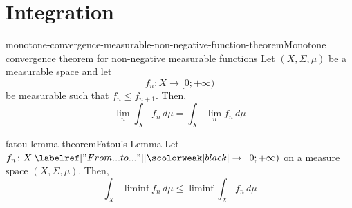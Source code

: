 \documentclass[preview]{standalone}
\begin{document}
\genpage

\section{Integration}

\begin{snippettheorem}{monotone-convergence-measurable-non-negative-function-theorem}{Monotone convergence theorem for non-negative measurable functions}
    Let \((X, \Sigma, \mu)\) be a measurable space and let
    \[
        f_n \colon X \to [0; +\infty)
    \] be measurable
    such that \(f_n \leq f_{n+1}\). Then,
    \[
        \lim_n \int_X f_n\,d\mu = \int_X \lim_n f_n\,d\mu
    \]
\end{snippettheorem}

\begin{snippettheorem}{fatou-lemma-theorem}{Fatou's Lemma}
    Let \(f_n \colon X \fromto [0; +\infty)\) on a measure space \((X, \Sigma, \mu)\). Then,
    \[
        \int_X \liminf f_n \, d\mu \leq \liminf \int_X f_n \, d\mu
    \]
\end{snippettheorem}
\end{document}

